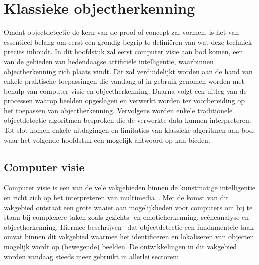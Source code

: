 \section{Klassieke objectherkenning}\label{sec:ls-object-detectie}
Omdat objectdetectie de kern van de proof-of-concept zal vormen, is het van essentieel belang om eerst een grondig begrip te defini\"eren van wat deze techniek precies inhoudt.
In dit hoofdstuk zal eerst computer visie aan bod komen, een van de gebieden van hedendaagse artifici\"ele intelligentie, waarbinnen objectherkenning zich plaats vindt.
Dit zal verduidelijkt worden aan de hand van enkele praktische toepassingen die vandaag al in gebruik genomen worden met behulp van computer visie en objectherkenning.
Daarna volgt een uitleg van de processen waarop beelden opgeslagen en verwerkt worden ter voorbereiding op het toepassen van objectherkenning.
Vervolgens worden enkele traditionele objectdetectie algoritmen besproken die de verwerkte data kunnen interpreteren.
Tot slot komen enkele uitdagingen en limitaties van klassieke algoritmen aan bod, waar het volgende hoofdstuk een mogelijk antwoord op kan bieden.

\subsection{Computer visie}\label{subsec:de-kern-van-objectdetectie}
Computer visie is een van de vele vakgebieden binnen de kunstmatige intelligentie en richt zich op het interpreteren van multimedia~\autocite{Moin2023}.
Met de komst van dit vakgebied ontstaat een grote waaier aan mogelijkheden voor computers om bij te staan bij complexere taken zoals gezichts- en emotieherkenning, sc\`eneanalyse en objectherkenning.
Hiermee beschrijven~\textcite{Tasnim2023} dat objectdetectie een fundamentele taak omvat binnen dit vakgebied waarmee het identificeren en lokaliseren van objecten mogelijk wordt op (bewegende) beelden.
De ontwikkelingen in dit vakgebied worden vandaag steeds meer gebruikt in allerlei sectoren:

